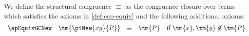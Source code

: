 \begin{definition}\label{def:safeap-equiv}
  We define the structural congruence $\equiv$ as the congruence closure over
  terms which satisfies the axioms in \cref{def:ccp-equiv} and the following
  additional axioms:
  \begin{gather*}
    \begin{array}{llcll}
      \apEquivGCNew
      & \tm{\piNew{xy}{P}}
      & \equiv
      & \tm{P}
      & \text{if }\tm{x},\tm{y}\not\in\tm{P}
    \end{array}
  \end{gather*}
\end{definition}
